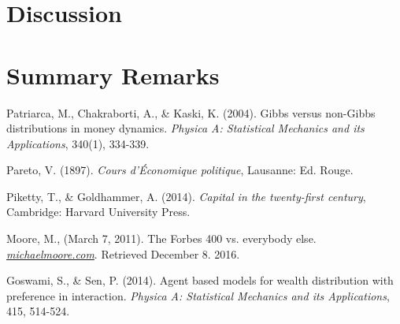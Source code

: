 \documentclass[10pt, a4paper]{amsart}
\begin{document}
\section{Discussion}

\section{Summary Remarks}


\begin{thebibliography}{10}

 Patriarca, M., Chakraborti, A., \& Kaski, K. (2004). 
	Gibbs versus non-Gibbs distributions in money dynamics. 
	\emph{Physica A: Statistical Mechanics and its Applications},
	340(1), 334-339.
	
 Pareto, V. (1897).
	\emph{Cours d'Économique politique},
	Lausanne: Ed. Rouge.
	
 Piketty, T., \& Goldhammer, A. (2014).
	\emph{Capital in the twenty-first century},
	Cambridge: Harvard University Press.
	
 Moore, M., (March 7, 2011).
	The Forbes 400 vs. everybody else.
	\emph{\href{https://web.archive.org/web/20110309211959/http://www.michaelmoore.com/words/must-read/forbes-400-vs-everybody-else}{michaelmoore.com}}.
	Retrieved December 8. 2016.

 Goswami, S., \& Sen, P. (2014).
	Agent based models for wealth distribution with preference in interaction.
	\emph{Physica A: Statistical Mechanics and its Applications},
	415, 514-524.

\end{thebibliography}
\end{document}
